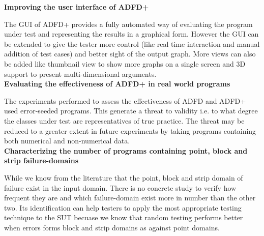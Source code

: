 \textbf{Improving the user interface of ADFD+}

The GUI of ADFD+ provides a fully automated way of evaluating the program under test and representing the results in a graphical form. However the GUI can be extended to give the tester more control (like real time interaction and manual addition of test cases) and better sight of the output graph. More views can also be added like thumbnail view to show more graphs on a single screen and 3D support to present multi-dimensional arguments.\\

\textbf{Evaluating the effectiveness of ADFD+ in real world programs}

The experiments performed to assess the effectiveness of ADFD and ADFD+ used error-seeded programs. This generate a threat to validity i.e. to what degree the classes under test are representatives of true practice. The threat may be reduced to a greater extent in future experiments by taking programs containing both numerical and non-numerical data.  \\

\textbf{Characterizing the number of programs containing point, block and strip failure-domains}

While we know from the literature that the point, block and strip domain of failure exist in the input domain. There is no concrete study to verify how frequent they are and which failure-domain exist more in number than the other two. Its identification can help testers to apply the most appropriate testing technique to the SUT becuase we know that random testing performs better when errors forms block and strip domains as against point domains.\\
	




